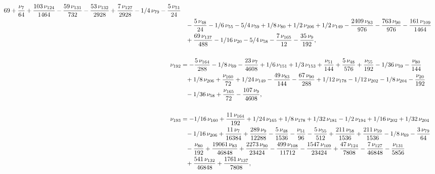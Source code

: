 \documentclass[a4paper,12pt, DIV=14, BCOR=5mm, twoside, headsepline]{scrbook}
\begin{document}
\begin{align}
\begin{aligned}
{{69}}+{\frac {\nu_{{7}}}{64}}+{\frac {103\,\nu_{{124}}}{1464}}-{\frac {
59\,\nu_{{131}}}{732}}-{\frac {53\,\nu_{{132}}}{2928}}+{\frac {7\,\nu_
{{127}}}{2928}}-1/4\,\nu_{{79}}-{\frac {5\,\nu_{{51}}}{24}}\\
 &\hphantom{=}-{\frac {5
\,\nu_{{48}}}{24}}-1/6\,\nu_{{55}}-5/4\,\nu_{{59}}+1/8\,\nu_{{80}}+1/2
\,\nu_{{206}}+1/2\,\nu_{{149}}-{\frac {2409\,\nu_{{83}}}{976}}-{\frac 
{763\,\nu_{{90}}}{976}}-{\frac {161\,\nu_{{109}}}{1464}}\\
 &\hphantom{=}+{\frac {69\,
\nu_{{137}}}{488}}-1/16\,\nu_{{20}}-5/4\,\nu_{{58}}-{\frac {7\,\nu_{{
165}}}{12}}-{\frac {35\,\nu_{{9}}}{192}}, \\
\\
\nu_{{192}}&=-{\frac {5\,\nu_{
{164}}}{288}}-1/8\,\nu_{{69}}-{\frac {23\,\nu_{{7}}}{4608}}+1/6\,\nu_{
{151}}+1/3\,\nu_{{153}}+{\frac {\nu_{{51}}}{144}}+{\frac {5\,\nu_{{48}
}}{576}}+{\frac {\nu_{{55}}}{192}}-1/36\,\nu_{{59}}-{\frac {\nu_{{80}}
}{144}}\\
 &\hphantom{=}+1/8\,\nu_{{206}}+{\frac {\nu_{{160}}}{72}}+1/24\,\nu_{{149}}-{
\frac {49\,\nu_{{83}}}{144}}-{\frac {67\,\nu_{{90}}}{288}}+1/12\,\nu_{
{178}}-1/12\,\nu_{{202}}-1/8\,\nu_{{204}}-{\frac {\nu_{{20}}}{192}}\\
 &\hphantom{=}-1/
36\,\nu_{{58}}+{\frac {\nu_{{165}}}{72}}-{\frac {107\,\nu_{{9}}}{4608}
}, \\
\\
\nu_{{193}}&=-1/16\,\nu_{{160}}+{\frac {11\,\nu_{{164}}}{192}}+1/24\,
\nu_{{165}}+1/8\,\nu_{{178}}+1/32\,\nu_{{181}}-1/2\,\nu_{{194}}+1/16\,
\nu_{{202}}+1/32\,\nu_{{204}}\\
 &\hphantom{=}-1/16\,\nu_{{206}}+{\frac {11\,\nu_{{7}}
}{16384}}+{\frac {289\,\nu_{{9}}}{12288}}-{\frac {5\,\nu_{{48}}}{1536}
}-{\frac {\nu_{{51}}}{96}}-{\frac {5\,\nu_{{55}}}{512}}+{\frac {211\,
\nu_{{58}}}{1536}}+{\frac {211\,\nu_{{59}}}{1536}}-1/8\,\nu_{{69}}-{
\frac {3\,\nu_{{79}}}{64}}\\
 &\hphantom{=}-{\frac {\nu_{{80}}}{192}}+{\frac {19061\,
\nu_{{83}}}{46848}}+{\frac {2273\,\nu_{{90}}}{23424}}-{\frac {499\,\nu
_{{108}}}{11712}}-{\frac {1547\,\nu_{{109}}}{23424}}+{\frac {47\,\nu_{
{124}}}{7808}}-{\frac {7\,\nu_{{127}}}{46848}}-{\frac {\nu_{{131}}}{
5856}}\\
 &\hphantom{=}+{\frac {541\,\nu_{{132}}}{46848}}+{\frac {1761\,\nu_{{137}}}{
7808}}, 
\end{aligned}
\end{align}
\end{document}
